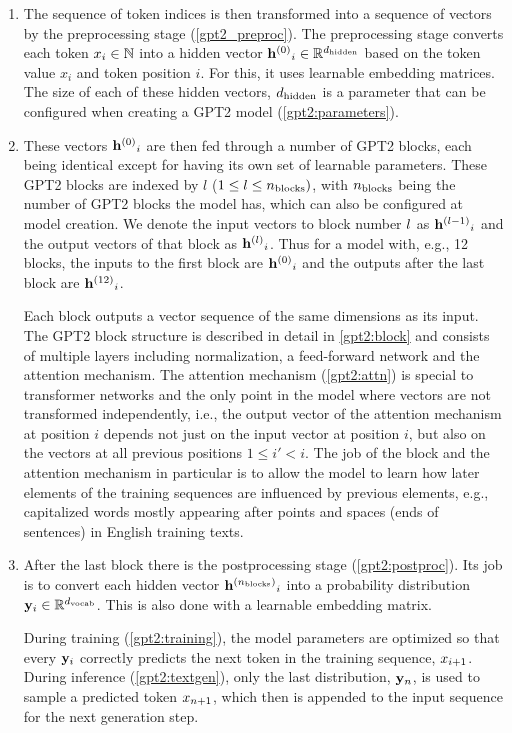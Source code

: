 \begin{enumerate}
	\item The sequence of token indices is then transformed into a sequence of vectors by the preprocessing stage (\cref{gpt2_preproc}). The preprocessing stage converts each token ${x}_i \in \mathbb{N}$ into a hidden vector ${{\mathbf{h}}^{(0)}}_i \in \mathbb{R}^{d_\textrm{hidden}}$ based on the token value $x_i$ and token position $i$. For this, it uses learnable embedding matrices.
	The size of each of these hidden vectors, ${d_\textrm{hidden}}$ is a parameter that can be configured when creating a GPT2 model (\cref{gpt2:parameters}).
	
	\item These vectors ${{\mathbf{h}}^{(0)}}_i$ are then fed through a number of GPT2 blocks, each being identical except for having its own set of learnable parameters. These GPT2 blocks are indexed by $l$ ($1 \leq l \leq {n_\textrm{blocks}})$, with ${n_\textrm{blocks}}$ being the number of GPT2 blocks the model has, which can also be configured at model creation.
	We denote the input vectors to block number ${l}$ as ${{\mathbf{h}}^{({l}-1)}}_i$ and the output vectors of that block as ${{\mathbf{h}}^{({l})}}_i$. Thus for a model with, e.g., 12 blocks, the inputs to the first block are ${{\mathbf{h}}^{(0)}}_i$ and the outputs after the last block are ${{\mathbf{h}}^{(12)}}_i$.
	
	Each block outputs a vector sequence of the same dimensions as its input.
	The GPT2 block structure is described in detail in \cref{gpt2:block} and consists of multiple layers including normalization, a feed-forward network and the attention mechanism. The attention mechanism (\cref{gpt2:attn}) is special to transformer networks and the only point in the model where vectors are not transformed independently, i.e., the output vector of the attention mechanism at position $i$  depends not just on the input vector at position $i$, but also on the vectors at all previous positions $1 \leq i' < i$.
	The job of the block and the attention mechanism in particular is to allow the model to learn how later elements of the training sequences are influenced by previous elements, e.g., capitalized words mostly appearing after points and spaces (ends of sentences) in English training texts.
	
	\item After the last block there is the postprocessing stage (\cref{gpt2:postproc}). Its job is to convert each hidden vector ${{\mathbf{h}}^{({n_\textrm{blocks}})}}_i$ into a probability distribution ${\mathbf{y}}_i \in \mathbb{R}^{{d_\textrm{vocab}}}$. This is also done with a learnable embedding matrix.
	
	During training (\cref{gpt2:training}), the model parameters are optimized so that every ${\mathbf{y}}_i$ correctly predicts the next token in the training sequence, ${x}_{i+1}$.
	During inference (\cref{gpt2:textgen}), only the last distribution, ${\mathbf{y}}_n$, is used to sample a predicted token ${x}_{n+1}$, which then is appended to the input sequence for the next generation step.
\end{enumerate}

